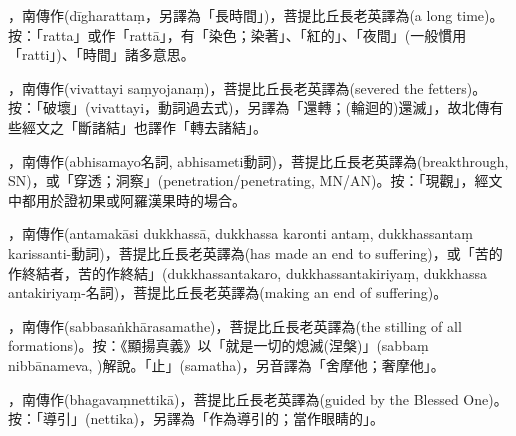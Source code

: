 \startitemgroup[noteitems]
\item{}，南傳作(dīgharattaṃ，另譯為「長時間」)，菩提比丘長老英譯為(a long time)。按：「ratta」或作「rattā」，有「染色；染著」、「紅的」、「夜間」(一般慣用「ratti」)、「時間」諸多意思。
\stopitemgroup

\startitemgroup[noteitems]
\item{}，南傳作(vivattayi saṃyojanaṃ)，菩提比丘長老英譯為(severed the fetters)。按：「破壞」(vivattayi，動詞過去式)，另譯為「還轉；(輪迴的)還滅」，故北傳有些經文之「斷諸結」也譯作「轉去諸結」。
\stopitemgroup

\startitemgroup[noteitems]
\item{}，南傳作(abhisamayo名詞, abhisameti動詞)，菩提比丘長老英譯為(breakthrough, SN)，或「穿透；洞察」(penetration/penetrating, MN/AN)。按：「現觀」，經文中都用於證初果或阿羅漢果時的場合。
\stopitemgroup

\startitemgroup[noteitems]
\item{}，南傳作(antamakāsi dukkhassā, dukkhassa karonti antaṃ, dukkhassantaṃ karissanti-動詞)，菩提比丘長老英譯為(has made an end to suffering)，或「苦的作終結者，苦的作終結」(dukkhassantakaro, dukkhassantakiriyaṃ, dukkhassa antakiriyaṃ-名詞)，菩提比丘長老英譯為(making an end of suffering)。
\stopitemgroup

\startitemgroup[noteitems]
\item{}，南傳作(sabbasaṅkhārasamathe)，菩提比丘長老英譯為(the stilling of all formations)。按：《顯揚真義》以「就是一切的熄滅(涅槃)」(sabbaṃ nibbānameva, )解說。「止」(samatha)，另音譯為「舍摩他；奢摩他」。
\stopitemgroup

\startitemgroup[noteitems]
\item{}，南傳作(bhagavaṃnettikā)，菩提比丘長老英譯為(guided by the Blessed One)。按：「導引」(nettika)，另譯為「作為導引的；當作眼睛的」。
\stopitemgroup

